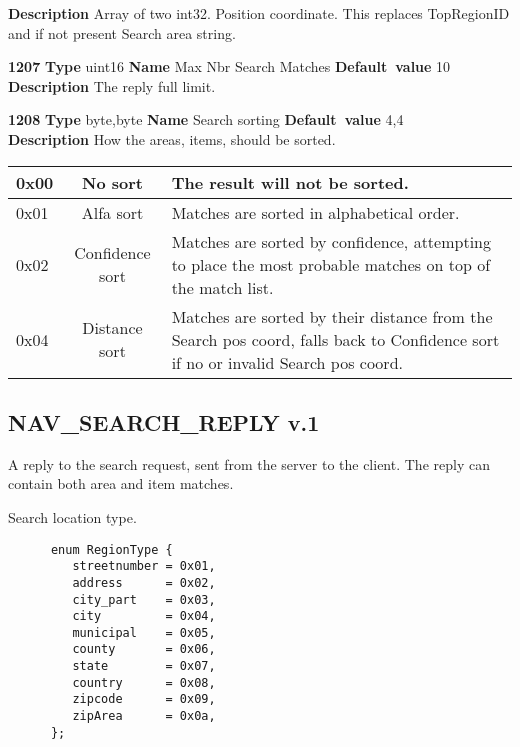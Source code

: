 \documentclass[a4paper]{article}
\begin{document}
\begin{list}{\textbf{ParamID}}{}
  \label{Search pos coord}
  \textbf{Description} Array of two int32. Position coordinate. This replaces
  TopRegionID and if not present Search area string.
\item \textbf{1207} \textbf{Type} uint16 \textbf{Name} Max Nbr Search Matches
                 \textbf{Default~value} 10 \\
  \label{Max Nbr Search Matches}
  \textbf{Description} The reply full limit.
\item \textbf{1208} \textbf{Type} byte,byte \textbf{Name} Search sorting
                 \textbf{Default~value} 4,4 \\
  \label{Search sorting}
  \textbf{Description} How the areas, items, should be sorted.\\
  \begin{tabular}{|l|c|p{7cm}|} \hline
    0x00  & No sort         & The result will not be sorted. \\\hline
    0x01  & Alfa sort       & Matches are sorted in alphabetical order.\\\hline
    0x02  & Confidence sort & Matches are sorted by confidence, attempting to
    place the most probable matches on top of the match list. \\\hline
    0x04  & Distance sort   & Matches are sorted by their distance from the
    Search pos coord, falls back to Confidence sort if no or invalid 
    Search pos coord. \\\hline
  \end{tabular}
\end{list}


\subsection{NAV\_SEARCH\_REPLY v.1}

A reply to the search request, sent from the server
to the client. The reply can contain both area and item matches.

Search location type.
\begin{verbatim}
      enum RegionType {
         streetnumber = 0x01,
         address      = 0x02,
         city_part    = 0x03,
         city         = 0x04,
         municipal    = 0x05,
         county       = 0x06,
         state        = 0x07,
         country      = 0x08,
         zipcode      = 0x09,
         zipArea      = 0x0a,
      };
\end{verbatim}
\label{SearchLocationType}
\end{document}
